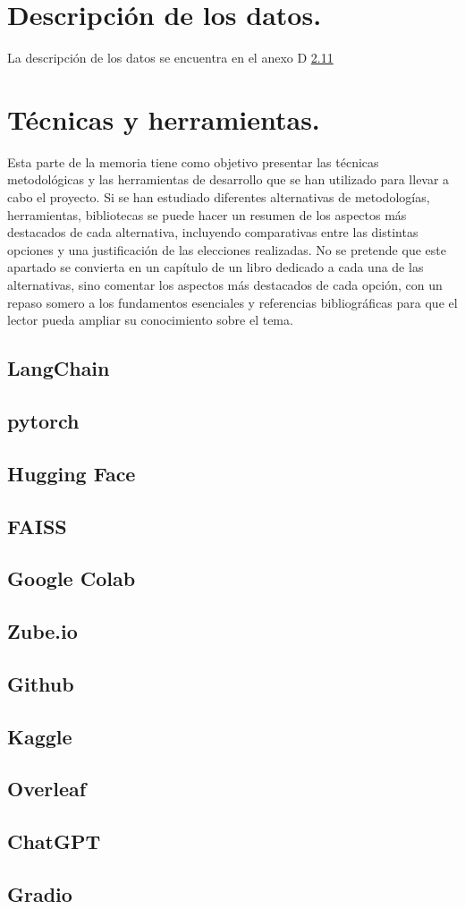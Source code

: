 
\section{Descripción de los datos.}

La descripción de los datos se encuentra en el anexo D
\ref{}

\section{Técnicas y herramientas.}

Esta parte de la memoria tiene como objetivo presentar las técnicas metodológicas y las herramientas de desarrollo que se han utilizado para llevar a cabo el proyecto. Si se han estudiado diferentes alternativas de metodologías, herramientas, bibliotecas se puede hacer un resumen de los aspectos más destacados de cada alternativa, incluyendo comparativas entre las distintas opciones y una justificación de las elecciones realizadas. 
No se pretende que este apartado se convierta en un capítulo de un libro dedicado a cada una de las alternativas, sino comentar los aspectos más destacados de cada opción, con un repaso somero a los fundamentos esenciales y referencias bibliográficas para que el lector pueda ampliar su conocimiento sobre el tema.

\subsection{LangChain}
\subsection{pytorch}
\subsection{Hugging Face}
\subsection{FAISS}
\subsection{Google Colab}
\subsection{Zube.io}
\subsection{Github}
\subsection{Kaggle}
\subsection{Overleaf}
\subsection{ChatGPT}
\subsection{Gradio}








